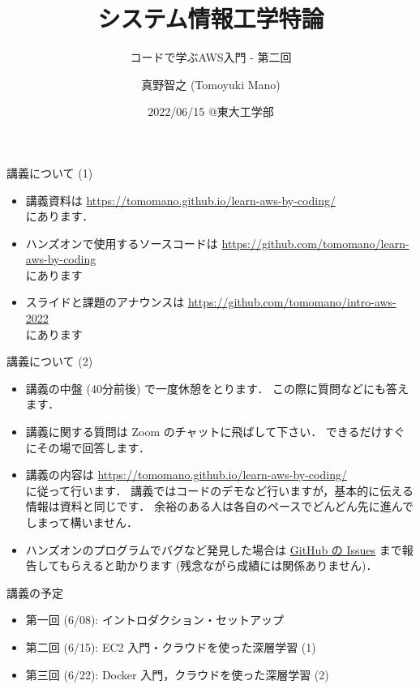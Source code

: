 \documentclass[unicode,11pt]{beamer}
\title{システム情報工学特論}
\subtitle{コードで学ぶAWS入門 - 第二回}
\author{真野智之 (Tomoyuki Mano)}
\institute[OIST]{Okinawa Institute of Science and Technology (OIST)}
\date{2022/06/15 @東大工学部}
\begin{document}
\frame{\titlepage}

\begin{frame}{講義について (1)}
\begin{itemize}
    \item 講義資料は
    \url{https://tomomano.github.io/learn-aws-by-coding/}\\
    にあります．
    \item ハンズオンで使用するソースコードは \url{https://github.com/tomomano/learn-aws-by-coding}\\
    にあります
    \item スライドと課題のアナウンスは
    \url{https://github.com/tomomano/intro-aws-2022}\\
    にあります
\end{itemize}
\end{frame}

\begin{frame}{講義について (2)}
\begin{itemize}
    \item 講義の中盤 (40分前後) で一度休憩をとります．
    この際に質問などにも答えます．
    \item 講義に関する質問は Zoom のチャットに飛ばして下さい．
    できるだけすぐにその場で回答します．
    \item 講義の内容は
    \url{https://tomomano.github.io/learn-aws-by-coding/}\\
    に従って行います．
    講義ではコードのデモなど行いますが，基本的に伝える情報は資料と同じです．
    余裕のある人は各自のペースでどんどん先に進んでしまって構いません．
    \item ハンズオンのプログラムでバグなど発見した場合は
    \href{https://github.com/tomomano/learn-aws-by-coding/issues}{GitHub の Issues}
    まで報告してもらえると助かります (残念ながら成績には関係ありません)．
\end{itemize}

\end{frame}

\begin{frame}{講義の予定}
    \begin{itemize}
        \item 第一回 (6/08): イントロダクション・セットアップ
        \item 第二回 (6/15): EC2 入門・クラウドを使った深層学習 (1)
        \item 第三回 (6/22): Docker 入門，クラウドを使った深層学習 (2)
    \end{itemize}
\end{frame}
\end{document}
